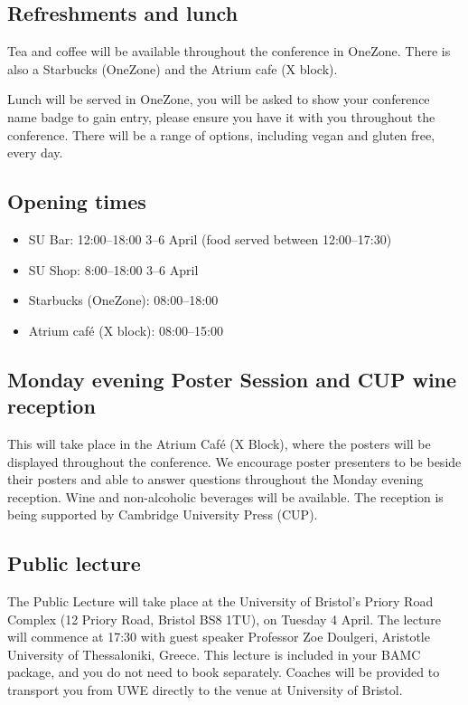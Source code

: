 \documentclass[12pt,a4paper]{article}
\begin{document}
\subsection{Refreshments and lunch}

Tea and coffee will be available throughout the conference in OneZone. There is also a Starbucks (OneZone) and the Atrium cafe (X block).

Lunch will be served in OneZone, you will be asked to show your conference name badge to gain entry, please ensure you have it with you throughout the conference. There will be a range of options, including vegan and gluten free, every day.

\subsection{Opening times}

\begin{itemize}
\item SU Bar: 12:00--18:00 3--6 April (food served between 12:00--17:30)
\item SU Shop: 8:00--18:00 3--6 April
\item Starbucks (OneZone): 08:00--18:00
\item Atrium café (X block): 08:00--15:00
\end{itemize}

\subsection{Monday evening Poster Session and CUP wine reception}

This will take place in the Atrium Café (X Block), where the posters will be displayed throughout the conference. We encourage poster presenters to be beside their posters and able to answer questions throughout the Monday evening reception. Wine and non-alcoholic beverages will be available. The reception is being supported by Cambridge University Press (CUP).

\subsection{Public lecture}

The Public Lecture will take place at the University of Bristol's Priory Road Complex (12 Priory Road, Bristol BS8 1TU), on Tuesday 4 April. The lecture will commence at 17:30 with guest speaker Professor Zoe Doulgeri, Aristotle University of Thessaloniki, Greece. This lecture is included in your BAMC package, and you do not need to book separately. Coaches will be provided to transport you from UWE directly to the venue at University of Bristol.
\end{document}
